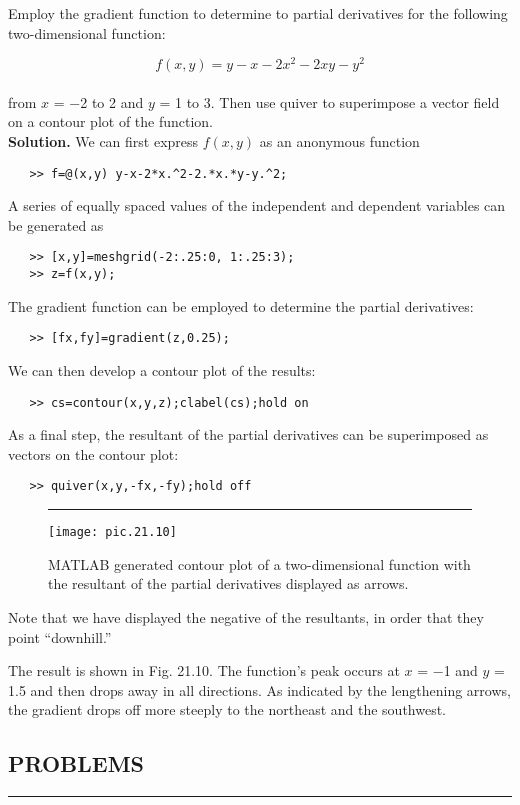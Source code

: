 \documentclass[../main.tex]{subfiles}
\begin{document}
Employ the gradient function to determine to partial derivatives for the following
two-dimensional function:

	$$f(x,y) = y-x-2x^{2} - 2xy - y^{2}$$\\
from $x$ = −2 to 2 and $y$ = 1 to 3. Then use quiver to superimpose a vector field on a contour plot of the function.\\
\textbf{Solution.} We can first express $f(x, y)$ as an anonymous function
\begin{verbatim}
   >> f=@(x,y) y-x-2*x.^2-2.*x.*y-y.^2;
\end{verbatim}
A series of equally spaced values of the independent and dependent variables can be generated as
\begin{verbatim}
   >> [x,y]=meshgrid(-2:.25:0, 1:.25:3);
   >> z=f(x,y);
\end{verbatim}
The gradient function can be employed to determine the partial derivatives:
\begin{verbatim}
   >> [fx,fy]=gradient(z,0.25);
\end{verbatim}
We can then develop a contour plot of the results:
\begin{verbatim}
   >> cs=contour(x,y,z);clabel(cs);hold on
\end{verbatim}
As a final step, the resultant of the partial derivatives can be superimposed as vectors on the
contour plot:
\begin{verbatim}
   >> quiver(x,y,-fx,-fy);hold off
\end{verbatim}

\begin{figure}[hbt!]
	\caption{\textsf{MATLAB generated contour plot of a two-dimensional function with the resultant of the partial
derivatives displayed as arrows.}} \hrule \vspace{0.2in}
\centering
	\texttt{[image: pic.21.10]}
	\label{pic.21.10}
\end{figure}
Note that we have displayed the negative of the resultants, in order that they point 
“downhill.”

The result is shown in Fig. 21.10. The function's peak occurs at $x$ = −1 and $y$ = 1.5
and then drops away in all directions. As indicated by the lengthening arrows, the gradient
drops off more steeply to the northeast and the southwest.

\subsection*{PROBLEMS} \hrule
\end{document}

